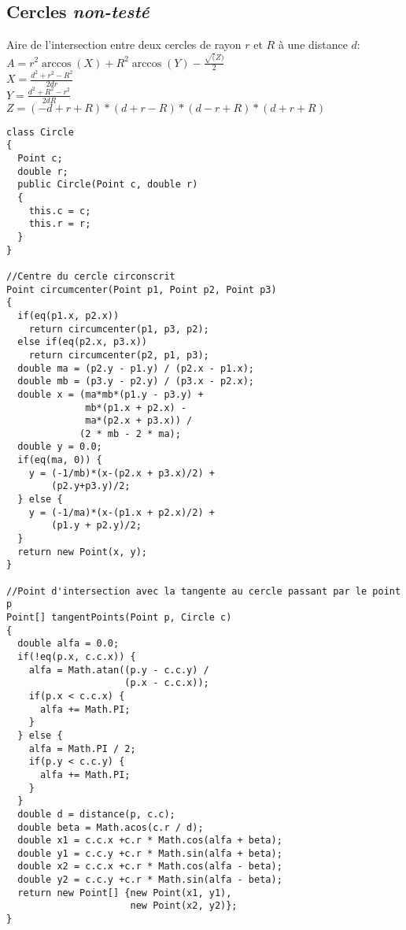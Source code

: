 \subsection{Cercles {\footnotesize \textit{non-testé}}}
Aire de l'intersection entre deux cercles de rayon $r$ et $R$ à une distance $d$:
$A = r^2\arccos(X) + R^2 \arccos(Y) - \frac{\sqrt(Z)}{2}$\\
$X = \frac{d^2+r^2-R^2}{2dr}$\\
$Y = \frac{d^2+R^2-r^2}{2dR}$\\
$Z = (-d+r+R)*(d+r-R)*(d-r+R)*(d+r+R)$
\begin{lstlisting}
class Circle
{
  Point c;
  double r;
  public Circle(Point c, double r)
  {
    this.c = c;
    this.r = r;
  }
}

//Centre du cercle circonscrit
Point circumcenter(Point p1, Point p2, Point p3)
{
  if(eq(p1.x, p2.x))
    return circumcenter(p1, p3, p2);
  else if(eq(p2.x, p3.x))
    return circumcenter(p2, p1, p3);
  double ma = (p2.y - p1.y) / (p2.x - p1.x);
  double mb = (p3.y - p2.y) / (p3.x - p2.x);
  double x = (ma*mb*(p1.y - p3.y) + 
              mb*(p1.x + p2.x) - 
              ma*(p2.x + p3.x)) / 
             (2 * mb - 2 * ma);
  double y = 0.0;
  if(eq(ma, 0)) {
    y = (-1/mb)*(x-(p2.x + p3.x)/2) +  
        (p2.y+p3.y)/2; 	
  } else {
    y = (-1/ma)*(x-(p1.x + p2.x)/2) + 
        (p1.y + p2.y)/2; 	
  }
  return new Point(x, y);
}

//Point d'intersection avec la tangente au cercle passant par le point p
Point[] tangentPoints(Point p, Circle c)
{
  double alfa = 0.0;
  if(!eq(p.x, c.c.x)) {
    alfa = Math.atan((p.y - c.c.y) / 
                     (p.x - c.c.x));
    if(p.x < c.c.x) {
      alfa += Math.PI;
    }
  } else {
    alfa = Math.PI / 2;
    if(p.y < c.c.y) {
      alfa += Math.PI;
    }
  }
  double d = distance(p, c.c);
  double beta = Math.acos(c.r / d);	    
  double x1 = c.c.x +c.r * Math.cos(alfa + beta);  
  double y1 = c.c.y +c.r * Math.sin(alfa + beta);
  double x2 = c.c.x +c.r * Math.cos(alfa - beta);  
  double y2 = c.c.y +c.r * Math.sin(alfa - beta);  
  return new Point[] {new Point(x1, y1), 
                      new Point(x2, y2)};
}
\end{lstlisting}
